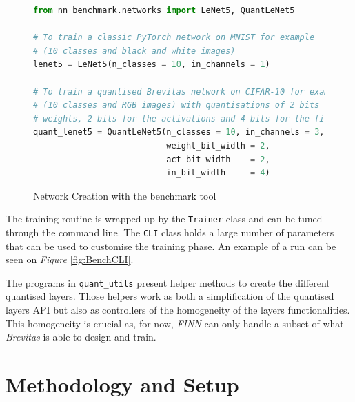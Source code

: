 \begin{figure}[htbp]
\centering
\begin{lstlisting}[language=Python]
from nn_benchmark.networks import LeNet5, QuantLeNet5

# To train a classic PyTorch network on MNIST for example
# (10 classes and black and white images)
lenet5 = LeNet5(n_classes = 10, in_channels = 1)

# To train a quantised Brevitas network on CIFAR-10 for example
# (10 classes and RGB images) with quantisations of 2 bits for the
# weights, 2 bits for the activations and 4 bits for the first layer
quant_lenet5 = QuantLeNet5(n_classes = 10, in_channels = 3,
                           weight_bit_width = 2,
                           act_bit_width    = 2,
                           in_bit_width     = 4)
\end{lstlisting}
\caption[NetworkCreation]{Network Creation with the benchmark tool}
	\label{fig:NetworkCreation}
\end{figure}


The training routine is wrapped up by the \texttt{Trainer} class and can be tuned through the command line. The \texttt{CLI} class holds a large number of parameters that can be used to customise the training phase. An example of a run can be seen on \emph{Figure} \ref{fig:BenchCLI}.


The programs in \texttt{quant\_utils\/} present helper methods to create the different quantised layers. Those helpers work as both a simplification of the quantised layers API but also as controllers of the homogeneity of the layers functionalities. This homogeneity is crucial as, for now, \emph{FINN} can only handle a subset of what \emph{Brevitas} is able to design and train.


\section{Methodology and Setup}


